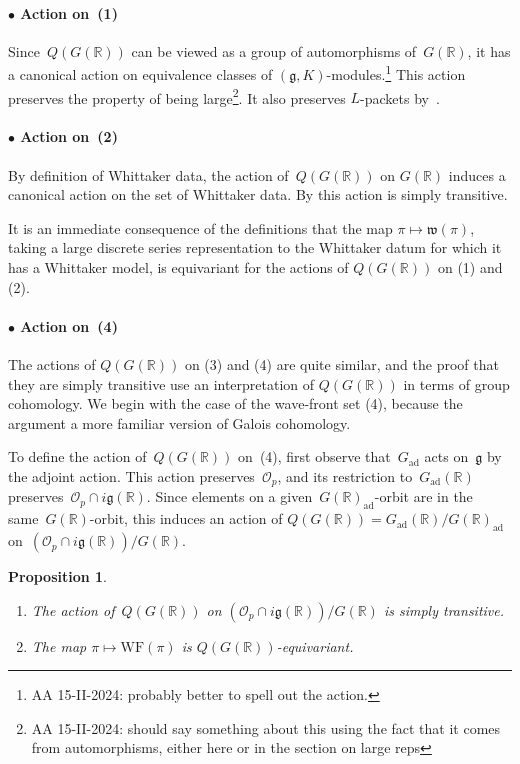 \documentclass[10pt,leqno]{article}
\newtheorem{proposition}[equation]{Proposition}
\newcommand{\Gad}{G_\mathrm{ad}}
\renewcommand{\O}{\mathcal O}
\newcommand{\R}{\mathbb R}
\newcommand{\g}{\mathfrak g}
\newcommand{\w}{\mathfrak w}
\newcommand{\WF}{\mathrm{WF}}
\newcommand{\Op}{\O_p}
\begin{document}
\paragraph*{$\bullet$ Action on~(1)} Since~$Q(G(\R))$ can be viewed as a group of automorphisms of~$G(\R)$,  it has a canonical action on equivalence classes of $(\g, K)$-modules.\footnote{AA 15-II-2024: probably better to spell out the action.} This action preserves  the property of being large\footnote{AA 15-II-2024: should say something about this using the fact that it comes from automorphisms, either here or in the section on large reps}. It also preserves $L$-packets by~\cite[Lemma 6.18]{Contragredient}.

\paragraph*{$\bullet$ Action on~(2)}  By definition of Whittaker data, the action of~$Q(G(\R))$ on $G(\R)$ induces a canonical action on the set of Whittaker data. By \cite[(14.15)]{abv} this action is simply transitive. 

It is an immediate consequence of the definitions that the map $\pi \mapsto \w(\pi)$, taking a large discrete series representation to the Whittaker datum for which it has a Whittaker model, is equivariant for the actions of $Q(G(\R))$ on (1) and (2). 


\paragraph*{$\bullet$ Action on~(4)} The actions of $Q(G(\R))$ on (3) and (4) are quite similar, and the proof that they are simply transitive use an interpretation of $Q(G(\R))$ in terms of group cohomology. 
We begin with the case of the wave-front set (4), because the argument a more familiar version of  Galois cohomology. 

To define the action of~$Q(G(\R))$ on~(4), first observe that~$\Gad$ acts on~$\g$ by the adjoint action. This action preserves~$\Op$, and its restriction to~$\Gad(\R)$ preserves~$\Op\cap i\g(\R)$. Since elements on a given~$G(\R)_{\mathrm{ad}}$-orbit are in the same~$G(\R)$-orbit, this induces an action of $Q(G(\R))=\Gad(\R)/G(\R)_{\mathrm{ad}}$ on~$(\Op\cap i\g(\R))/G(\R)$.

\begin{proposition}\label{prop:action_on_real_orbits}
\begin{enumerate} 
\item The action of~$Q(G(\R))$ on $(\Op\cap i\g(\R))/G(\R)$ is simply transitive.
\item The map $\pi \mapsto \WF(\pi)$ is $Q(G(\R))$-equivariant.
\end{enumerate}
\end{proposition}
\end{document}
